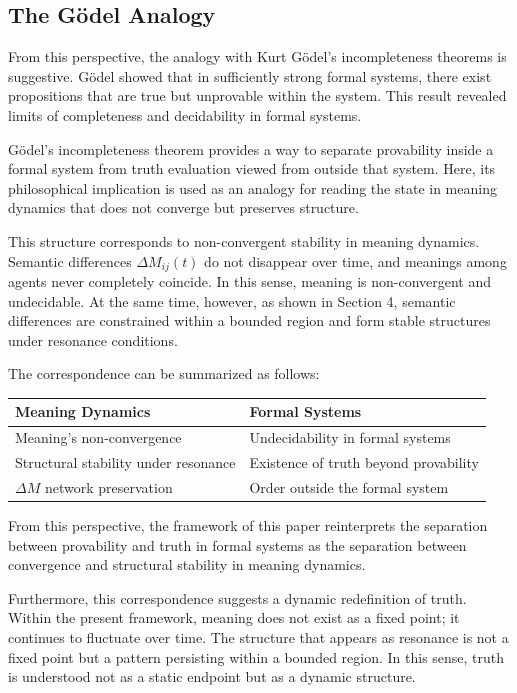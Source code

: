 \documentclass[11pt,a4paper]{article}
\theoremstyle{definition}
\begin{document}
\subsection{The Gödel Analogy}

From this perspective, the analogy with Kurt Gödel's incompleteness theorems is suggestive. Gödel showed that in sufficiently strong formal systems, there exist propositions that are true but unprovable within the system. This result revealed limits of completeness and decidability in formal systems.

Gödel's incompleteness theorem provides a way to separate provability inside a formal system from truth evaluation viewed from outside that system. Here, its philosophical implication is used as an analogy for reading the state in meaning dynamics that does not converge but preserves structure.

This structure corresponds to non-convergent stability in meaning dynamics. Semantic differences $\Delta M_{ij}(t)$ do not disappear over time, and meanings among agents never completely coincide. In this sense, meaning is non-convergent and undecidable. At the same time, however, as shown in Section 4, semantic differences are constrained within a bounded region and form stable structures under resonance conditions.

The correspondence can be summarized as follows:

\begin{table}[h]
\centering
\begin{tabular}{ll}
\hline
\textbf{Meaning Dynamics} & \textbf{Formal Systems} \\
\hline
Meaning's non-convergence & Undecidability in formal systems \\
Structural stability under resonance & Existence of truth beyond provability \\
$\Delta M$ network preservation & Order outside the formal system \\
\hline
\end{tabular}
\end{table}

From this perspective, the framework of this paper reinterprets the separation between provability and truth in formal systems as the separation between convergence and structural stability in meaning dynamics.

Furthermore, this correspondence suggests a dynamic redefinition of truth. Within the present framework, meaning does not exist as a fixed point; it continues to fluctuate over time. The structure that appears as resonance is not a fixed point but a pattern persisting within a bounded region. In this sense, truth is understood not as a static endpoint but as a dynamic structure.
\end{document}
